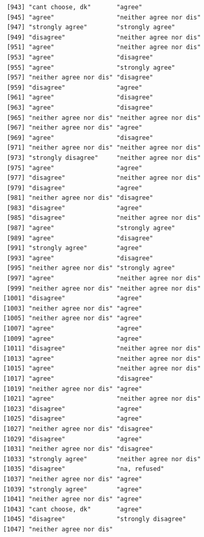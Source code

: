 \documentclass{beamer}\usepackage[]{graphicx}\usepackage[]{color}
\makeatletter
\newenvironment{kframe}{%
 \def\at@end@of@kframe{}%
 \ifinner\ifhmode%
  \def\at@end@of@kframe{\end{minipage}}%
  \begin{minipage}{\columnwidth}%
 \fi\fi%
 \def\FrameCommand##1{\hskip\@totalleftmargin \hskip-\fboxsep
 \colorbox{shadecolor}{##1}\hskip-\fboxsep
     \hskip-\linewidth \hskip-\@totalleftmargin \hskip\columnwidth}%
 \MakeFramed {\advance\hsize-\width
   \@totalleftmargin\z@ \linewidth\hsize
   \@setminipage}}%
 {\par\unskip\endMakeFramed%
 \at@end@of@kframe}
\newenvironment{knitrout}{}{} %
\makeatother
\begin{document}
\begin{frame}[fragile]
\begin{knitrout}
\begin{kframe}
\begin{verbatim}
 [943] "cant choose, dk"       "agree"                
 [945] "agree"                 "neither agree nor dis"
 [947] "strongly agree"        "strongly agree"       
 [949] "disagree"              "neither agree nor dis"
 [951] "agree"                 "neither agree nor dis"
 [953] "agree"                 "disagree"             
 [955] "agree"                 "strongly agree"       
 [957] "neither agree nor dis" "disagree"             
 [959] "disagree"              "agree"                
 [961] "agree"                 "disagree"             
 [963] "agree"                 "disagree"             
 [965] "neither agree nor dis" "neither agree nor dis"
 [967] "neither agree nor dis" "agree"                
 [969] "agree"                 "disagree"             
 [971] "neither agree nor dis" "neither agree nor dis"
 [973] "strongly disagree"     "neither agree nor dis"
 [975] "agree"                 "agree"                
 [977] "disagree"              "neither agree nor dis"
 [979] "disagree"              "agree"                
 [981] "neither agree nor dis" "disagree"             
 [983] "disagree"              "agree"                
 [985] "disagree"              "neither agree nor dis"
 [987] "agree"                 "strongly agree"       
 [989] "agree"                 "disagree"             
 [991] "strongly agree"        "agree"                
 [993] "agree"                 "disagree"             
 [995] "neither agree nor dis" "strongly agree"       
 [997] "agree"                 "neither agree nor dis"
 [999] "neither agree nor dis" "neither agree nor dis"
[1001] "disagree"              "agree"                
[1003] "neither agree nor dis" "agree"                
[1005] "neither agree nor dis" "agree"                
[1007] "agree"                 "agree"                
[1009] "agree"                 "agree"                
[1011] "disagree"              "neither agree nor dis"
[1013] "agree"                 "neither agree nor dis"
[1015] "agree"                 "neither agree nor dis"
[1017] "agree"                 "disagree"             
[1019] "neither agree nor dis" "agree"                
[1021] "agree"                 "neither agree nor dis"
[1023] "disagree"              "agree"                
[1025] "disagree"              "agree"                
[1027] "neither agree nor dis" "disagree"             
[1029] "disagree"              "agree"                
[1031] "neither agree nor dis" "disagree"             
[1033] "strongly agree"        "neither agree nor dis"
[1035] "disagree"              "na, refused"          
[1037] "neither agree nor dis" "agree"                
[1039] "strongly agree"        "agree"                
[1041] "neither agree nor dis" "agree"                
[1043] "cant choose, dk"       "agree"                
[1045] "disagree"              "strongly disagree"    
[1047] "neither agree nor dis"
\end{verbatim}
\end{kframe}
\end{knitrout}
\end{frame}
\end{document}

